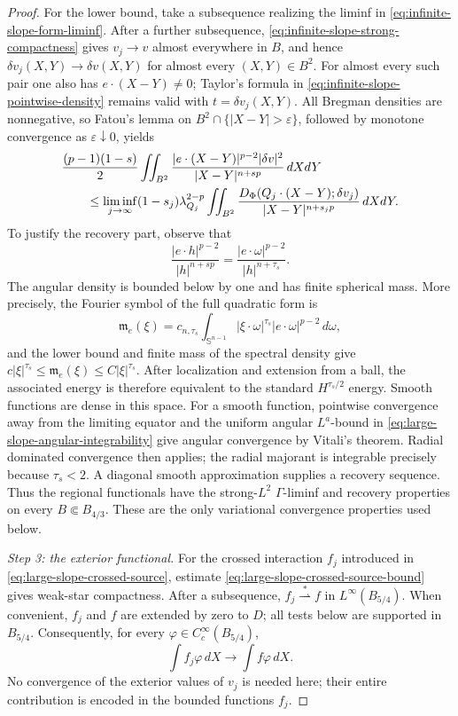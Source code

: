 \documentclass[11pt,reqno]{amsart}
\numberwithin{equation}{section}
\newcommand{\dd}{\,d}
\theoremstyle{remark}
\begin{document}
\begin{proof}
For the lower bound, take a subsequence realizing the liminf in
\eqref{eq:infinite-slope-form-liminf}.  After a further subsequence,
\eqref{eq:infinite-slope-strong-compactness} gives
\(v_j\to v\) almost everywhere in \(B\), and hence
\(\delta v_j(X,Y)\to\delta v(X,Y)\) for almost every
\((X,Y)\in B^2\).  For almost every such pair one also has
\(e\cdot(X-Y)\ne0\); Taylor's formula in
\eqref{eq:infinite-slope-pointwise-density} remains valid with
\(t=\delta v_j(X,Y)\).  All Bregman densities are nonnegative, so
Fatou's lemma on \(B^2\cap\{|X-Y|>\varepsilon\}\), followed by monotone
convergence as \(\varepsilon\downarrow0\), yields
\begin{align}
 &\frac{(p-1)(1-s)}2
 \iint_{B^2}
 \frac{|e\cdot(X-Y)|^{p-2}|\delta v|^2}
 {|X-Y|^{n+sp}}\dd X\!\dd Y\notag\\
 &\qquad\le\liminf_{j\to\infty}
 (1-s_j)\lambda_{Q_j}^{2-p}
 \iint_{B^2}
 \frac{D_\Phi(Q_j\cdot(X-Y);\delta v_j)}
 {|X-Y|^{n+s_jp}}\dd X\!\dd Y.
 \label{eq:infinite-slope-form-liminf}
\end{align}
To justify the recovery part, observe that
\[
 \frac{|e\cdot h|^{p-2}}{|h|^{n+sp}}
 =\frac{|e\cdot\omega|^{p-2}}{|h|^{n+\tau_s}}.
\]
The angular density is bounded below by one and has finite spherical
mass.  More precisely, the Fourier symbol of the full quadratic form is
\[
 \mathfrak m_e(\xi)
 =c_{n,\tau_s}\int_{\mathbb S^{n-1}}
 |\xi\cdot\omega|^{\tau_s}|e\cdot\omega|^{p-2}\dd\omega,
\]
and the lower bound and finite mass of the spectral density give
\(c|\xi|^{\tau_s}\le\mathfrak m_e(\xi)\le C|\xi|^{\tau_s}\).
After localization and extension from a ball, the associated energy is
therefore equivalent to the standard \(H^{\tau_s/2}\) energy.  Smooth
functions are dense in this space.  For a smooth function, pointwise
convergence away from the limiting equator and the uniform angular
\(L^a\)-bound in \eqref{eq:large-slope-angular-integrability} give
angular convergence by Vitali's theorem.  Radial dominated convergence
then applies; the radial majorant is integrable precisely because
\(\tau_s<2\).  A
diagonal smooth approximation supplies a recovery sequence.  Thus the
regional functionals have the strong-\(L^2\) \(\Gamma\)-liminf and
recovery properties on every \(B\Subset B_{4/3}\).  These are the only
variational convergence properties used below.

\emph{Step 3: the exterior functional.}
For the crossed interaction \(f_j\) introduced in
\eqref{eq:large-slope-crossed-source}, estimate
\eqref{eq:large-slope-crossed-source-bound} gives weak-star compactness.
After a subsequence,
\(f_j\stackrel{*}{\rightharpoonup}f\) in \(L^\infty(B_{5/4})\).
When convenient, \(f_j\) and \(f\) are extended by zero to \(D\); all
tests below are supported in \(B_{5/4}\).
Consequently, for every \(\varphi\in C_c^\infty(B_{5/4})\),
\begin{equation*}
 \int f_j\varphi\dd X\longrightarrow\int f\varphi\dd X.
\end{equation*}
No convergence of the exterior values of \(v_j\) is needed here; their
entire contribution is encoded in the bounded functions \(f_j\).


\end{proof}
\end{document}
